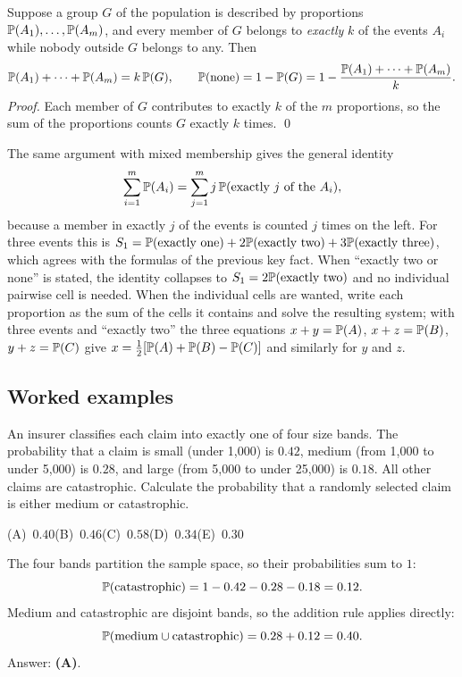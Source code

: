 \begin{keyfact}
Suppose a group $G$ of the population is described by proportions $\mathbb{P}(A_1), \dots,
\mathbb{P}(A_m)$, and every member of $G$ belongs to \emph{exactly} $k$ of the events $A_i$
while nobody outside $G$ belongs to any. Then
\[
\mathbb{P}(A_1) + \dots + \mathbb{P}(A_m) = k\,\mathbb{P}(G), \qquad
\mathbb{P}(\text{none}) = 1 - \mathbb{P}(G) = 1 - \frac{\mathbb{P}(A_1) + \dots + \mathbb{P}(A_m)}{k}.
\]
\emph{Proof.} Each member of $G$ contributes to exactly $k$ of the $m$ proportions, so the
sum of the proportions counts $G$ exactly $k$ times. \qed

The same argument with mixed membership gives the general identity
\[
\sum_{i=1}^{m} \mathbb{P}(A_i) = \sum_{j=1}^{m} j\,\mathbb{P}(\text{exactly } j \text{ of the } A_i),
\]
because a member in exactly $j$ of the events is counted $j$ times on the left. For three
events this is $S_1 = \mathbb{P}(\text{exactly one}) + 2\mathbb{P}(\text{exactly two}) +
3\mathbb{P}(\text{exactly three})$, which agrees with the formulas of the previous key fact.
When ``exactly two or none'' is stated, the identity collapses to
$S_1 = 2\mathbb{P}(\text{exactly two})$ and no individual pairwise cell is needed. When the
individual cells are wanted, write each proportion as the sum of the cells it contains and
solve the resulting system; with three events and ``exactly two'' the three equations
$x + y = \mathbb{P}(A)$, $x + z = \mathbb{P}(B)$, $y + z = \mathbb{P}(C)$ give
$x = \tfrac12[\mathbb{P}(A) + \mathbb{P}(B) - \mathbb{P}(C)]$ and similarly for $y$ and $z$.
\end{keyfact}

\subsection{Worked examples}

\begin{example}
An insurer classifies each claim into exactly one of four size bands. The probability that a
claim is small (under 1{,}000) is $0.42$, medium (from 1{,}000 to under 5{,}000) is $0.28$,
and large (from 5{,}000 to under 25{,}000) is $0.18$. All other claims are catastrophic.
Calculate the probability that a randomly selected claim is either medium or catastrophic.

\smallskip\noindent (A)~$0.40$\hfill (B)~$0.46$\hfill (C)~$0.58$\hfill (D)~$0.34$\hfill (E)~$0.30$\hfill\mbox{}
\end{example}
\begin{solution}
The four bands partition the sample space, so their probabilities sum to $1$:
\[
\mathbb{P}(\text{catastrophic}) = 1 - 0.42 - 0.28 - 0.18 = 0.12.
\]
Medium and catastrophic are disjoint bands, so the addition rule applies directly:
\[
\mathbb{P}(\text{medium} \cup \text{catastrophic}) = 0.28 + 0.12 = 0.40.
\]
Answer: \textbf{(A)}.
\end{solution}

